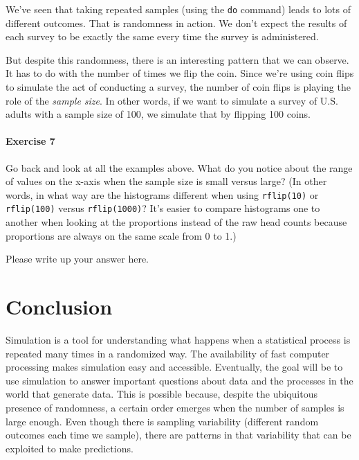 \documentclass[
]{book}
\begin{document}
We've seen that taking repeated samples (using the \texttt{do} command) leads to lots of different outcomes. That is randomness in action. We don't expect the results of each survey to be exactly the same every time the survey is administered.

But despite this randomness, there is an interesting pattern that we can observe. It has to do with the number of times we flip the coin. Since we're using coin flips to simulate the act of conducting a survey, the number of coin flips is playing the role of the \emph{sample size}. In other words, if we want to simulate a survey of U.S. adults with a sample size of 100, we simulate that by flipping 100 coins.

\hypertarget{exercise-7-2}{%
\paragraph*{Exercise 7}\label{exercise-7-2}}

Go back and look at all the examples above. What do you notice about the range of values on the x-axis when the sample size is small versus large? (In other words, in what way are the histograms different when using \texttt{rflip(10)} or \texttt{rflip(100)} versus \texttt{rflip(1000)}? It's easier to compare histograms one to another when looking at the proportions instead of the raw head counts because proportions are always on the same scale from 0 to 1.)

Please write up your answer here.

\hypertarget{randomization1-conclusion}{%
\section{Conclusion}\label{randomization1-conclusion}}

Simulation is a tool for understanding what happens when a statistical process is repeated many times in a randomized way. The availability of fast computer processing makes simulation easy and accessible. Eventually, the goal will be to use simulation to answer important questions about data and the processes in the world that generate data. This is possible because, despite the ubiquitous presence of randomness, a certain order emerges when the number of samples is large enough. Even though there is sampling variability (different random outcomes each time we sample), there are patterns in that variability that can be exploited to make predictions.
\end{document}

